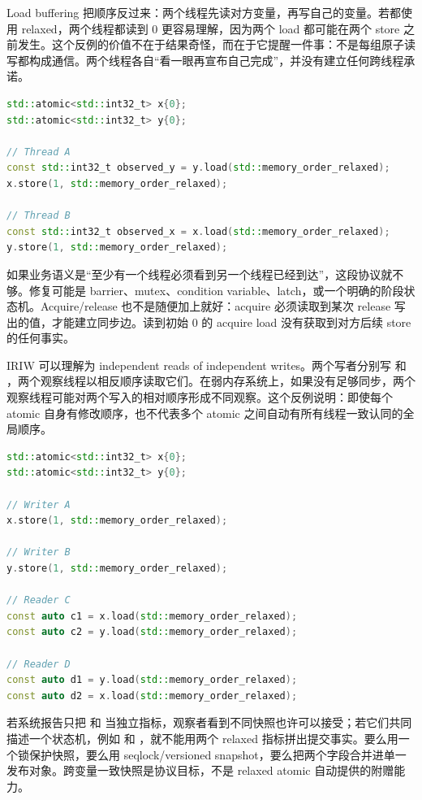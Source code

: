 Load buffering 把顺序反过来：两个线程先读对方变量，再写自己的变量。若都使用 relaxed，两个线程都读到 0 更容易理解，因为两个 load 都可能在两个 store 之前发生。这个反例的价值不在于结果奇怪，而在于它提醒一件事：不是每组原子读写都构成通信。两个线程各自“看一眼再宣布自己完成”，并没有建立任何跨线程承诺。

\begin{lstlisting}[language=C++,caption={Load buffering：先观察再发布不能互相证明}]
std::atomic<std::int32_t> x{0};
std::atomic<std::int32_t> y{0};

// Thread A
const std::int32_t observed_y = y.load(std::memory_order_relaxed);
x.store(1, std::memory_order_relaxed);

// Thread B
const std::int32_t observed_x = x.load(std::memory_order_relaxed);
y.store(1, std::memory_order_relaxed);
\end{lstlisting}

如果业务语义是“至少有一个线程必须看到另一个线程已经到达”，这段协议就不够。修复可能是 barrier、mutex、condition variable、latch，或一个明确的阶段状态机。Acquire/release 也不是随便加上就好：acquire 必须读取到某次 release 写出的值，才能建立同步边。读到初始 0 的 acquire load 没有获取到对方后续 store 的任何事实。

IRIW 可以理解为 independent reads of independent writes。两个写者分别写  和 ，两个观察线程以相反顺序读取它们。在弱内存系统上，如果没有足够同步，两个观察线程可能对两个写入的相对顺序形成不同观察。这个反例说明：即使每个 atomic 自身有修改顺序，也不代表多个 atomic 之间自动有所有线程一致认同的全局顺序。

\begin{lstlisting}[language=C++,caption={IRIW：不同观察者可能形成不同跨变量顺序}]
std::atomic<std::int32_t> x{0};
std::atomic<std::int32_t> y{0};

// Writer A
x.store(1, std::memory_order_relaxed);

// Writer B
y.store(1, std::memory_order_relaxed);

// Reader C
const auto c1 = x.load(std::memory_order_relaxed);
const auto c2 = y.load(std::memory_order_relaxed);

// Reader D
const auto d1 = y.load(std::memory_order_relaxed);
const auto d2 = x.load(std::memory_order_relaxed);
\end{lstlisting}

若系统报告只把  和  当独立指标，观察者看到不同快照也许可以接受；若它们共同描述一个状态机，例如  和 ，就不能用两个 relaxed 指标拼出提交事实。要么用一个锁保护快照，要么用 seqlock/versioned snapshot，要么把两个字段合并进单一发布对象。跨变量一致快照是协议目标，不是 relaxed atomic 自动提供的附赠能力。

